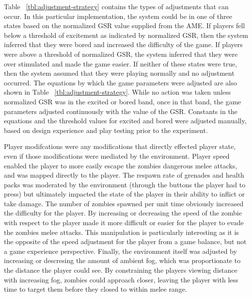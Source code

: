 \documentclass[conference]{IEEEtran}
\begin{document}
Table ~\ref{tbl:adjustment-strategy} contains the types of adjustments that can occur. In this particular implementation, the system could be in one of three states based on the normalized GSR value supplied from the AME. If players fell below a threshold of excitement as indicated by normalized GSR, then the system inferred that they were bored and increased the difficulty of the game. If players were above a threshold of normalized GSR, the system inferred that they were over stimulated and made the game easier. If neither of these states were true, then the system assumed that they were playing normally and no adjustment occurred. The equations by which the game parameters were adjusted are also shown in Table ~\ref{tbl:adjustment-strategy}. While no action was taken unless normalized GSR was in the excited or bored band, once in that band, the game parameters adjusted continuously with the value of the GSR. Constants in the equations and the threshold values for excited and bored were adjusted manually, based on design experience and play testing prior to the experiment.

Player modifcations were any modifications that directly effected player state, even if those modifications were mediated by the environment. Player speed enabled the player to more easily escape the zombies dangerous melee attacks, and was mapped directly to the player. The respawn rate of grenades and health packs was moderated by the environment (through the buttons the player had to press) but ultimately impacted the state of the player in their ability to inflict or take damage. The number of zombies spawned per unit time obviously increased the difficulty for the player. By increasing or decreasing the speed of the zombie with respect to the player made it more difficult or easier for the player to evade the zombies melee attacks. This manipulation is particularly interesting as it is the opposite of the speed adjustment for the player from a game balance, but not a game experience perspective. Finally, the environment itself was adjusted by increasing or descresing the amount of ambient fog, which was proportionate to the distance the player could see. By constraining the players viewing distance with increasing fog, zombies could approach closer, leaving the player with less time to target them before they closed to within melee range.
\end{document}
